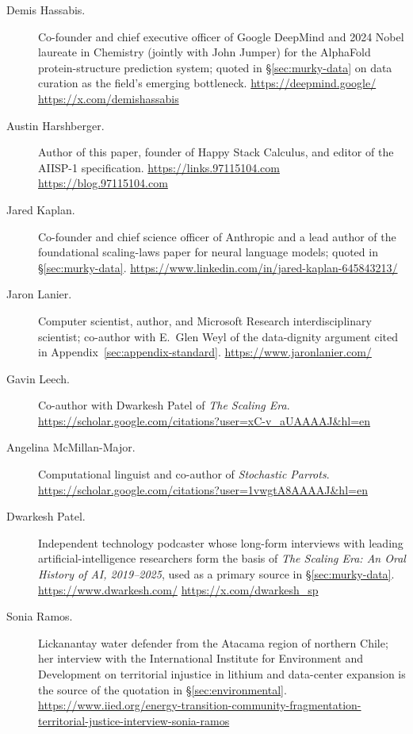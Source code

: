 \documentclass[10pt,a4paper,twocolumn]{article}
\begin{document}
\begin{description}
\item[Demis Hassabis.] Co-founder and chief executive officer of Google DeepMind and 2024 Nobel laureate in Chemistry (jointly with John Jumper) for the AlphaFold protein-structure prediction system; quoted in \S\ref{sec:murky-data} on data curation as the field's emerging bottleneck. \url{https://deepmind.google/} \quad \url{https://x.com/demishassabis}

\item[Austin Harshberger.] Author of this paper, founder of Happy Stack Calculus, and editor of the AIISP-1 specification. \url{https://links.97115104.com} \quad \url{https://blog.97115104.com}

\item[Jared Kaplan.] Co-founder and chief science officer of Anthropic and a lead author of the foundational scaling-laws paper for neural language models; quoted in \S\ref{sec:murky-data}. \url{https://www.linkedin.com/in/jared-kaplan-645843213/}

\item[Jaron Lanier.] Computer scientist, author, and Microsoft Research interdisciplinary scientist; co-author with E.~Glen Weyl of the data-dignity argument cited in Appendix~\ref{sec:appendix-standard}. \url{https://www.jaronlanier.com/}

\item[Gavin Leech.] Co-author with Dwarkesh Patel of \emph{The Scaling Era}. \url{https://scholar.google.com/citations?user=xC-v_aUAAAAJ&hl=en}

\item[Angelina McMillan-Major.] Computational linguist and co-author of \emph{Stochastic Parrots}. \url{https://scholar.google.com/citations?user=1vwgtA8AAAAJ&hl=en}

\item[Dwarkesh Patel.] Independent technology podcaster whose long-form interviews with leading artificial-intelligence researchers form the basis of \emph{The Scaling Era: An Oral History of AI, 2019--2025}, used as a primary source in \S\ref{sec:murky-data}. \url{https://www.dwarkesh.com/} \quad \url{https://x.com/dwarkesh_sp}

\item[Sonia Ramos.] Lickanantay water defender from the Atacama region of northern Chile; her interview with the International Institute for Environment and Development on territorial injustice in lithium and data-center expansion is the source of the quotation in \S\ref{sec:environmental}. \url{https://www.iied.org/energy-transition-community-fragmentation-territorial-justice-interview-sonia-ramos}


\end{description}
\end{document}
